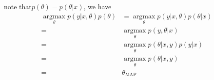 \begin{answer}
note that$ p(\theta)=p(\theta|x) $, we have
\begin{align*}
\operatorname*{argmax}_{\theta}p(y|x,\theta)p(\theta)
& = \operatorname*{argmax}_{\theta}p(y|x,\theta)p(\theta|x)\\
= &\operatorname*{argmax}_{\theta}p(y,\theta|x)\\
= &\operatorname*{argmax}_{\theta}p(\theta|x,y)p(y|x)\\
= &\operatorname*{argmax}_{\theta}p(\theta|x,y)\\
= &\theta_{\text{MAP}}
\end{align*}
\end{answer}
